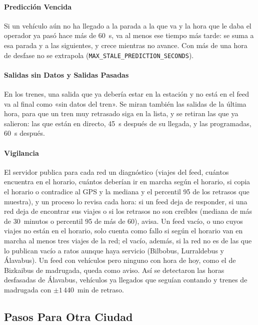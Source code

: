 \paragraph{Predicción Vencida} Si un vehículo aún no ha llegado a la parada a la que va y la hora que le daba el
operador ya pasó hace más de 60~s, va al menos ese tiempo más tarde: se suma a esa parada y a las siguientes, y crece
mientras no avance. Con más de una hora de desfase no se extrapola (\texttt{MAX\_STALE\_PREDICTION\_SECONDS}).

\paragraph{Salidas sin Datos y Salidas Pasadas} En los trenes, una salida que ya debería estar en la estación y no está en el
feed va al final como «sin datos del tren». Se miran también las salidas de la última hora, para que un tren muy
retrasado siga en la lista, y se retiran las que ya salieron: las que están en directo, 45~s después de su llegada, y las
programadas, 60~s después.

\paragraph{Vigilancia} El servidor publica para cada red un diagnóstico (viajes del feed, cuántos encuentra en el
horario, cuántos deberían ir en marcha según el horario, si copia el horario o contradice al GPS y la mediana y el
percentil 95 de los retrasos que muestra), y un proceso lo revisa cada hora: si un feed deja de responder, si una red
deja de encontrar sus viajes o si los retrasos no son creíbles (mediana de más de 30~minutos o percentil 95 de más de
60), avisa. Un feed vacío, o uno cuyos viajes no están en el horario, solo cuenta como fallo si según el horario van en
marcha al menos tres viajes de la red; el vacío, además, si la red no es de las que lo publican vacío a ratos aunque
haya servicio (Bilbobus, Lurraldebus y Álavabus). Un feed con vehículos pero ninguno con hora de hoy, como el de Bizkaibus
de madrugada, queda como aviso. Así se detectaron las horas desfasadas de Álavabus, vehículos ya llegados que seguían
contando y trenes de madrugada con $\pm1\,440$~min de retraso.

\subsection{Pasos Para Otra Ciudad}
\label{sec:pasos}

